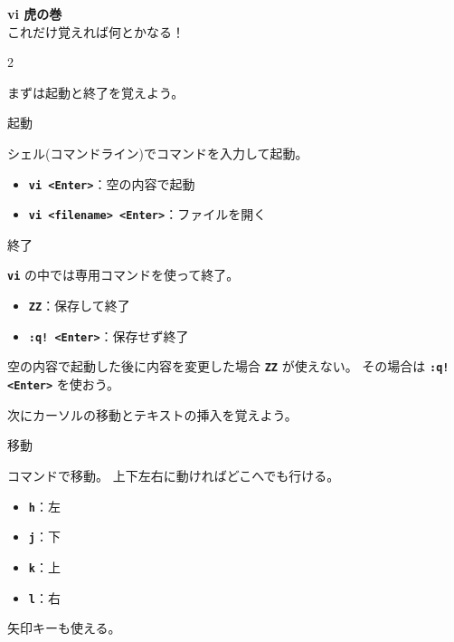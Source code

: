 



\begin{center}
  {\LARGE\bfseries vi 虎の巻} \\
  これだけ覚えれば何とかなる！
\end{center}

\begin{multicols}{2}

まずは起動と終了を覚えよう。

\begin{cheatbox}{起動}
\begin{small}
シェル(コマンドライン)でコマンドを入力して起動。
\end{small}
\begin{itemize}
  \item \texttt{\bfseries vi <Enter>}：空の内容で起動
  \item \texttt{\bfseries vi <filename> <Enter>}：ファイルを開く
\end{itemize}
\end{cheatbox}

\begin{cheatbox}{終了}
\begin{small}
\texttt{\bfseries vi} の中では専用コマンドを使って終了。
\end{small}
\begin{itemize}
  \item \texttt{\bfseries ZZ}：保存して終了
  \item \texttt{\bfseries :q! <Enter>}：保存せず終了
\end{itemize}
\begin{small}
空の内容で起動した後に内容を変更した場合 \texttt{\bfseries ZZ} が使えない。
その場合は \texttt{\bfseries :q! <Enter>} を使おう。
\end{small}
\end{cheatbox}

次にカーソルの移動とテキストの挿入を覚えよう。

\begin{cheatbox}{移動}
\begin{small}
コマンドで移動。
上下左右に動ければどこへでも行ける。
\end{small}
\begin{itemize}
  \item \texttt{\bfseries h}：左
  \item \texttt{\bfseries j}：下
  \item \texttt{\bfseries k}：上
  \item \texttt{\bfseries l}：右
\end{itemize}
\begin{small}
矢印キーも使える。
\end{small}
\end{cheatbox}


\end{multicols}

